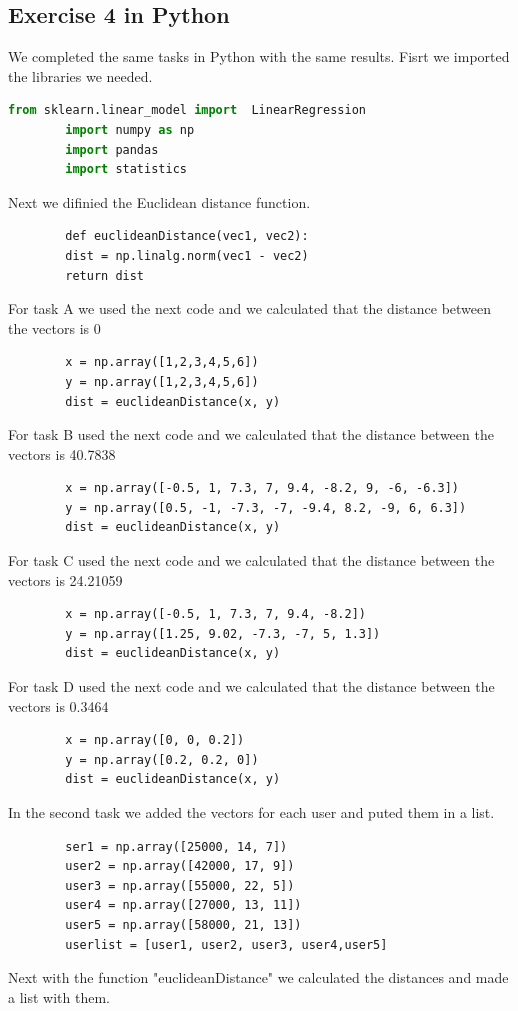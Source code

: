 \documentclass[10pt,a4paper]{article}
\begin{document}
	\subsection{Exercise 4 in Python}
	We completed the same tasks in Python with the same results.
	Fisrt we imported the libraries we needed.
	\begin{lstlisting}[language=Python]
		from sklearn.linear_model import  LinearRegression
		import numpy as np
		import pandas
		import statistics
	\end{lstlisting}
	Next we difinied the Euclidean distance function.
	\begin{lstlisting}
		def euclideanDistance(vec1, vec2):
		dist = np.linalg.norm(vec1 - vec2)
		return dist
	\end{lstlisting}
	For task A we used the next code and we calculated that the distance between the vectors is 0
	\begin{lstlisting}
		x = np.array([1,2,3,4,5,6])
		y = np.array([1,2,3,4,5,6])
		dist = euclideanDistance(x, y)
	\end{lstlisting}
	For task B used the next code and we calculated that the distance between the vectors is 40.7838
	\begin{lstlisting}
		x = np.array([-0.5, 1, 7.3, 7, 9.4, -8.2, 9, -6, -6.3])
		y = np.array([0.5, -1, -7.3, -7, -9.4, 8.2, -9, 6, 6.3])
		dist = euclideanDistance(x, y)
	\end{lstlisting}	
	For task C used the next code and we calculated that the distance between the vectors is 24.21059
	\begin{lstlisting}
		x = np.array([-0.5, 1, 7.3, 7, 9.4, -8.2])
		y = np.array([1.25, 9.02, -7.3, -7, 5, 1.3])
		dist = euclideanDistance(x, y)
	\end{lstlisting}	
	For task D used the next code and we calculated that the distance between the vectors is 0.3464
	\begin{lstlisting}
		x = np.array([0, 0, 0.2])
		y = np.array([0.2, 0.2, 0])
		dist = euclideanDistance(x, y)
	\end{lstlisting}	
	In the second task  we added the vectors for each user and puted them in a list.
	\begin{lstlisting}
		ser1 = np.array([25000, 14, 7])
		user2 = np.array([42000, 17, 9])
		user3 = np.array([55000, 22, 5])
		user4 = np.array([27000, 13, 11])
		user5 = np.array([58000, 21, 13])
		userlist = [user1, user2, user3, user4,user5]
	\end{lstlisting}
	Next with the function "euclideanDistance" we calculated the distances and made a list with them.
\end{document}
